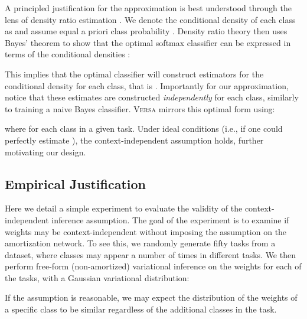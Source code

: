 \documentclass{article}
\newcommand{\Versa}{\textsc{Versa}}
\begin{document}
A principled justification for the approximation is best understood through the lens of density ratio estimation \citep{mohamed2018blog, sugiyama2012density}. We denote the conditional density of each class as  and assume equal a priori class probability . Density ratio theory then uses Bayes' theorem to show that the optimal softmax classifier can be expressed in terms of the conditional densities \citep{mohamed2018blog, sugiyama2012density}:

This implies that the optimal classifier will construct estimators for the conditional density for each class, that is . Importantly for our approximation, notice that these estimates are constructed \emph{independently} for each class, similarly to training a naive Bayes classifier. \Versa{} mirrors this optimal form using: 

where  for each class in a given task. Under ideal conditions (i.e., if one could perfectly estimate ), the context-independent assumption holds, further motivating our design.


\subsection{Empirical Justification}

Here we detail a simple experiment to evaluate the validity of the context-independent inference assumption. The goal of the experiment is to examine if weights may be context-independent without imposing the assumption on the amortization network. To see this, we randomly generate fifty tasks from a dataset, where classes may appear a number of times in different tasks. We then perform free-form (non-amortized) variational inference on the weights for each of the tasks, with a Gaussian variational distribution:


If the assumption is reasonable, we may expect the distribution of the weights of a specific class to be similar regardless of the additional classes in the task.
\end{document}
